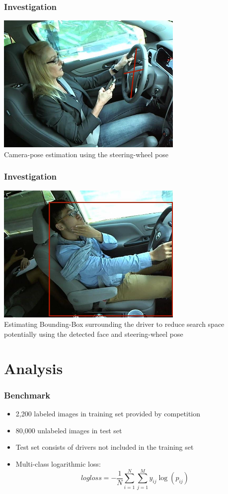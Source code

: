 \documentclass{beamer}
\begin{document}
    \begin{frame}
		\frametitle{Investigation}
        \begin{center}
        \includegraphics[width=9cm]{images/CameraPose.jpg}\\
        Camera-pose estimation using the steering-wheel pose\end{center}
    \end{frame}


    \begin{frame}
		\frametitle{Investigation}
        \begin{center}
        \includegraphics[width=9cm]{images/BoundingBox.jpg}\\
        Estimating Bounding-Box surrounding the driver to reduce search space potentially using the detected face and steering-wheel pose\end{center}
    \end{frame}

	
	\section{Analysis}	
	\begin{frame}
		\frametitle{Benchmark}
		\begin{itemize}
			\item 2,200 labeled images in training set provided by competition
			\item 80,000 unlabeled images in test set
			\item Test set consists of drivers not included in the training set
			\item Multi-class logarithmic loss: $$logloss = - \frac{1}{N} \sum_{i=1}^N \sum_{j=1}^M y_{ij} \log (p_{ij})$$
			
		\end{itemize}
		


	\end{frame}
\end{document}
